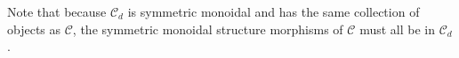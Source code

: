 \documentclass[11pt,a4paper]{article}
\theoremstyle{plain}
\theoremstyle{definition}
\newtheorem{definition}[theorem]{Definition}
\newtheorem{remark}[theorem]{Remark}
\newcommand{\C}{\mathscr{C}}
\newcommand{\op}{\mathrm{op}}
\newcommand{\todo}[1]{\textcolor{red}{\small #1}}
\begin{document}


Note that because $\C_d$ is symmetric monoidal and has the same collection of objects as $\C$, the symmetric monoidal structure morphisms of $\C$ must all be in $\C_d$.
\end{document}
